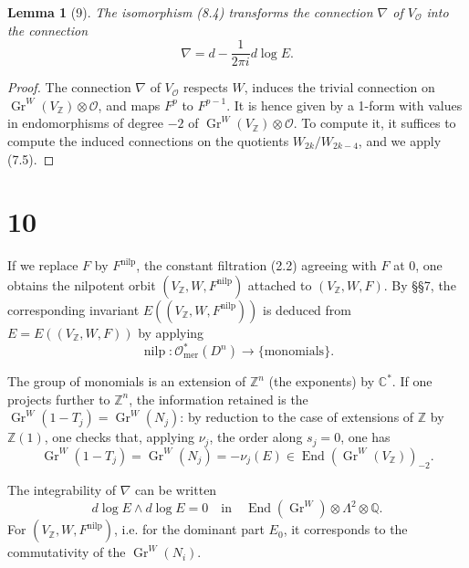 \documentclass[11pt,a4paper]{article}
\theoremstyle{plain}
\newtheorem{lemma}[theorem]{Lemma}
\theoremstyle{definition}
\DeclareMathOperator{\End}{End}
\DeclareMathOperator{\Gr}{Gr}
\DeclareMathOperator{\nilp}{nilp}
\begin{document}
\begin{lemma}[9]
The isomorphism (8.4) transforms the connection $\nabla$ of $V_{\mathcal{O}}$ into the connection
\[
\nabla = d - \frac{1}{2\pi i} d\log E.
\]
\end{lemma}

\begin{proof}
The connection $\nabla$ of $V_{\mathcal{O}}$ respects $W$, induces the trivial connection on $\Gr^{W}(V_{\mathbb{Z}}) \otimes \mathcal{O}$, and maps $F^{p}$ to $F^{p-1}$. It is hence given by a 1-form with values in endomorphisms of degree $-2$ of $\Gr^{W}(V_{\mathbb{Z}}) \otimes \mathcal{O}$. To compute it, it suffices to compute the induced connections on the quotients $W_{2k}/W_{2k-4}$, and we apply (7.5).
\end{proof}

\section{10}

If we replace $F$ by $F^{\text{nilp}}$, the constant filtration (2.2) agreeing with $F$ at 0, one obtains the nilpotent orbit $(V_{\mathbb{Z}}, W, F^{\text{nilp}})$ attached to $(V_{\mathbb{Z}}, W, F)$. By \S\S 7, the corresponding invariant $E((V_{\mathbb{Z}}, W, F^{\text{nilp}}))$ is deduced from $E = E((V_{\mathbb{Z}}, W, F))$ by applying
\begin{equation}
\nilp: \mathcal{O}_{\text{mer}}^{*}(D^{n}) \to \{\text{monomials}\}. \tag{10.1}
\end{equation}

The group of monomials is an extension of $\mathbb{Z}^{n}$ (the exponents) by $\mathbb{C}^{*}$. If one projects further to $\mathbb{Z}^{n}$, the information retained is the $\Gr^{W}(1-T_{j}) = \Gr^{W}(N_{j})$: by reduction to the case of extensions of $\mathbb{Z}$ by $\mathbb{Z}(1)$, one checks that, applying $\nu_{j}$, the order along $s_{j}=0$, one has
\begin{equation}
\Gr^{W}(1-T_{j}) = \Gr^{W}(N_{j}) = -\nu_{j}(E) \in \End(\Gr^{W}(V_{\mathbb{Z}}))_{-2}. \tag{10.2}
\end{equation}

The integrability of $\nabla$ can be written
\begin{equation}
d\log E \wedge d\log E = 0 \quad \text{in} \quad \End(\Gr^{W}) \otimes \Lambda^{2} \otimes \mathbb{Q}. \tag{10.3}
\end{equation}
For $(V_{\mathbb{Z}}, W, F^{\text{nilp}})$, i.e. for the dominant part $E_{0}$, it corresponds to the commutativity of the $\Gr^{W}(N_{i})$.
\end{document}
